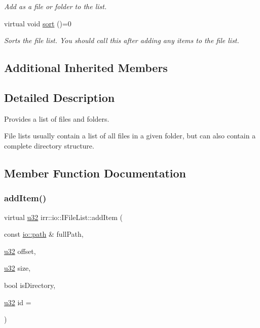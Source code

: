 \begin{DoxyCompactItemize}
\begin{DoxyCompactList}\small\item\em Add as a file or folder to the list. \end{DoxyCompactList}\item 
\mbox{\label{classirr_1_1io_1_1IFileList_a2cf4f12d7ee6ab35257169ec23654da8}} 
virtual void \hyperlink{classirr_1_1io_1_1IFileList_a2cf4f12d7ee6ab35257169ec23654da8}{sort} ()=0
\begin{DoxyCompactList}\small\item\em Sorts the file list. You should call this after adding any items to the file list. \end{DoxyCompactList}\end{DoxyCompactItemize}
\subsection*{Additional Inherited Members}


\subsection{Detailed Description}
Provides a list of files and folders. 

File lists usually contain a list of all files in a given folder, but can also contain a complete directory structure. 

\subsection{Member Function Documentation}
\mbox{\label{classirr_1_1io_1_1IFileList_ad0d90f1bb8a35910f4f877268e2f043e}} 
\subsubsection{\texorpdfstring{add\+Item()}{addItem()}}
{\footnotesize\ttfamily virtual \hyperlink{namespaceirr_a0416a53257075833e7002efd0a18e804}{u32} irr\+::io\+::\+I\+File\+List\+::add\+Item (\begin{DoxyParamCaption}\item[{const \hyperlink{namespaceirr_1_1io_ab1bdc45edb3f94d8319c02bc0f840ee1}{io\+::path} \&}]{full\+Path,  }\item[{\hyperlink{namespaceirr_a0416a53257075833e7002efd0a18e804}{u32}}]{offset,  }\item[{\hyperlink{namespaceirr_a0416a53257075833e7002efd0a18e804}{u32}}]{size,  }\item[{bool}]{is\+Directory,  }\item[{\hyperlink{namespaceirr_a0416a53257075833e7002efd0a18e804}{u32}}]{id = {} }\end{DoxyParamCaption})\hspace{0.3cm}{\ttfamily [pure virtual]}}



